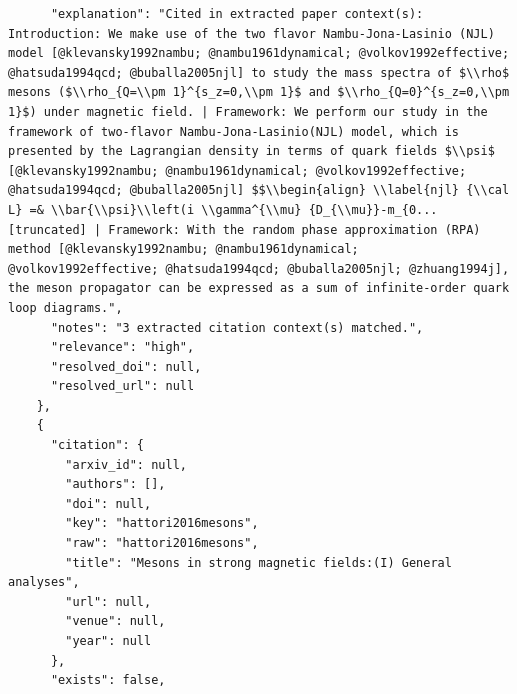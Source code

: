 \documentclass[11pt]{article}
\begin{document}
\begin{verbatim}
      "explanation": "Cited in extracted paper context(s): Introduction: We make use of the two flavor Nambu-Jona-Lasinio (NJL) model [@klevansky1992nambu; @nambu1961dynamical; @volkov1992effective; @hatsuda1994qcd; @buballa2005njl] to study the mass spectra of $\\rho$ mesons ($\\rho_{Q=\\pm 1}^{s_z=0,\\pm 1}$ and $\\rho_{Q=0}^{s_z=0,\\pm 1}$) under magnetic field. | Framework: We perform our study in the framework of two-flavor Nambu-Jona-Lasinio(NJL) model, which is presented by the Lagrangian density in terms of quark fields $\\psi$ [@klevansky1992nambu; @nambu1961dynamical; @volkov1992effective; @hatsuda1994qcd; @buballa2005njl] $$\\begin{align} \\label{njl} {\\cal L} =& \\bar{\\psi}\\left(i \\gamma^{\\mu} {D_{\\mu}}-m_{0... [truncated] | Framework: With the random phase approximation (RPA) method [@klevansky1992nambu; @nambu1961dynamical; @volkov1992effective; @hatsuda1994qcd; @buballa2005njl; @zhuang1994j], the meson propagator can be expressed as a sum of infinite-order quark loop diagrams.",
      "notes": "3 extracted citation context(s) matched.",
      "relevance": "high",
      "resolved_doi": null,
      "resolved_url": null
    },
    {
      "citation": {
        "arxiv_id": null,
        "authors": [],
        "doi": null,
        "key": "hattori2016mesons",
        "raw": "hattori2016mesons",
        "title": "Mesons in strong magnetic fields:(I) General analyses",
        "url": null,
        "venue": null,
        "year": null
      },
      "exists": false,

\end{verbatim}
\end{document}
